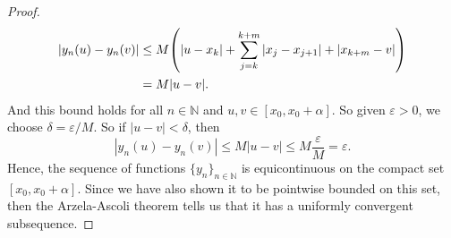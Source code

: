 \documentclass[12pt]{article}
\theoremstyle{definition}
\newcommand{\N}{\mathbb{N}}
\newcommand{\eps}{\varepsilon}
\begin{document}
\begin{proof}
\begin{align*}
        |y_n(u) - y_n(v)|
            &\leq M\qty(|u - x_k| + \sum_{j=k}^{k+m} |x_{j} - x_{j+1}| + |x_{k+m} - v|) \\
            &= M|u - v|.
    \end{align*}
    And this bound holds for all $n \in \N$ and $u, v \in [x_0, x_0 + \alpha]$. So given $\eps > 0$, we choose $\delta = \eps/M$. So if $|u - v| < \delta$, then
    \[
        |y_n(u) - y_n(v)|
            \leq M|u - v|
            \leq M\frac{\eps}{M}
            = \eps.
    \]
    Hence, the sequence of functions $\{y_n\}_{n \in \N}$ is equicontinuous on the compact set $[x_0, x_0 + \alpha]$. Since we have also shown it to be pointwise bounded on this set, then the Arzela-Ascoli theorem tells us that it has a uniformly convergent subsequence.
    
    
    

\end{proof}
\end{document}
